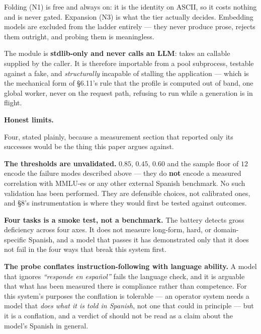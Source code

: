 Folding (N1) is free and always on: it is the identity on ASCII, so it costs
nothing and is never gated. Expansion (N3) is what the tier actually decides.
Embedding models are excluded from the ladder entirely --- they never produce
prose,  rejects them outright, and probing them is
meaningless.

The module is \textbf{stdlib-only and never calls an LLM}: 
takes an  callable supplied by the caller. It is
therefore importable from a pool subprocess, testable against a fake, and
\emph{structurally} incapable of stalling the application --- which is the
mechanical form of \S6.11's rule that the profile is computed out of band, one
global worker, never on the request path, refusing to run while a generation is
in flight.

\textbf{Honest limits.}

Four, stated plainly, because a measurement section that reported only its
successes would be the thing this paper argues against.

\textbf{The thresholds are unvalidated.} $0.85$, $0.45$, $0.60$ and the sample
floor of $12$ encode the failure modes described above --- they do \textbf{not}
encode a measured correlation with MMLU-es or any other external Spanish
benchmark. No such validation has been performed. They are defensible choices,
not calibrated ones, and \S8's instrumentation is where they would first be
tested against outcomes.

\textbf{Four tasks is a smoke test, not a benchmark.} The battery detects gross
deficiency across four axes. It does not measure long-form, hard, or
domain-specific Spanish, and a model that passes it has demonstrated only that
it does not fail in the four ways that break this system first.

\textbf{The probe conflates instruction-following with language ability.} A
model that ignores \foreignlanguage{spanish}{\emph{``responde en español''}}
fails the language check, and it is arguable that what has been measured there
is compliance rather than competence. For this system's purposes the conflation
is tolerable --- an operator system needs a model that \emph{does what it is
told in Spanish}, not one that could in principle --- but it is a conflation,
and a verdict of  should not be read as a claim about the model's
Spanish in general.

